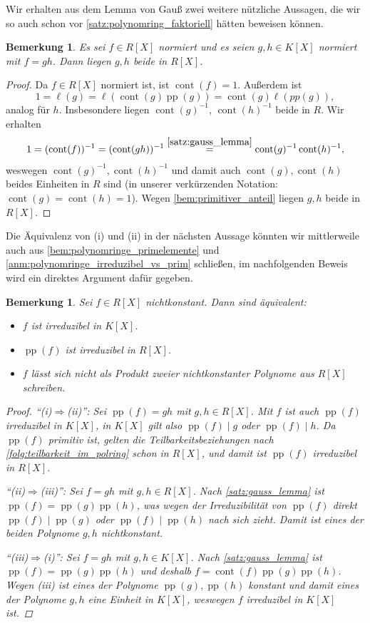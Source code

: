 \documentclass[a4paper, twoside, 11pt, ngerman]{report}
\DeclareMathOperator{\cont}{cont}
\DeclareMathOperator{\pp}{pp}
\theoremstyle{definistyle}
\newtheorem{bem}[satz]{Bemerkung}
\theoremstyle{remark}
\begin{document}
Wir erhalten aus dem Lemma von Gauß zwei weitere nützliche Aussagen, die wir so  
auch schon vor \ref{satz:polynomring_faktoriell} hätten beweisen können. 

\begin{bem}\label{bem:pol_schon_in_Rx}
Es sei $f\in R[X]$ normiert und es seien $g,h\in K[X]$ normiert mit $f=gh$.
Dann liegen $g,h$ beide in $R[X]$.
\end{bem}
\begin{proof}
Da $f\in R[X]$ normiert ist, ist $\cont(f)=1$. Außerdem ist
\[
1=\ell(g)=\ell(\cont(g)\pp(g))=\cont(g)\ell(pp(g)),
\]
analog für $h$. Insbesondere liegen $\cont(g)^{-1}$, $\cont(h)^{-1}$ beide in $R$. Wir erhalten
\[
1=(\cont(f))^{-1}=(\cont(gh))^{-1}\overset{\ref{satz:gauss_lemma}}{=}\cont(g)^{-1}\cont(h)^{-1},
\]
weswegen $\cont(g)^{-1},\cont(h)^{-1}$ und damit auch $\cont(g),\cont(h)$ beides Einheiten in $R$ sind (in unserer verkürzenden Notation: $\cont(g)=\cont(h)=1$). Wegen \ref{bem:primitiver_anteil} liegen $g,h$ beide in $R[X]$.
\end{proof}

Die Äquivalenz von (i) und (ii) in der nächsten Aussage könnten wir mittlerweile auch aus \ref{bem:polynomringe_primelemente} und \ref{anm:polynomringe_irreduzibel_vs_prim}
schließen, im nachfolgenden Beweis wird ein direktes Argument dafür gegeben.

\begin{bem}\label{bem:irreduzibilitaet_polynomringe}
Sei $f \in R[X]$ nichtkonstant. Dann sind äquivalent:
\begin{itemize}
    \item[(i)] $f$ ist irreduzibel in $K[X]$.
    \item[(ii)] $\pp(f)$ ist irreduzibel in $R[X]$.
    \item[(iii)] $f$ lässt sich nicht als Produkt zweier nichtkonstanter Polynome aus $R[X]$ schreiben.
\end{itemize}
\begin{proof}
"`(i)$\Rightarrow$(ii)"': Sei $\pp(f)=gh$ mit $g,h\in R[X]$. Mit $f$ ist auch $\pp(f)$ irreduzibel in $K[X]$, in $K[X]$ gilt also $\pp(f)\mid g$ oder $\pp(f)\mid h$.
Da $\pp(f)$ primitiv ist, gelten die Teilbarkeitsbeziehungen nach \ref{folg:teilbarkeit_im_polring} schon in $R[X]$,
und damit ist $\pp(f)$ irreduzibel in $R[X]$.

"`(ii)$\Rightarrow$(iii)"': Sei $f=gh$ mit $g,h\in R[X]$. Nach \ref{satz:gauss_lemma} ist
$\pp(f)=\pp(g)\pp(h)$, was wegen der Irreduzibilität von $\pp(f)$ direkt $\pp(f)\mid\pp(g)$ oder $\pp(f)\mid \pp(h)$ nach sich zieht. Damit ist eines der beiden Polynome $g,h$ nichtkonstant.

"`(iii)$\Rightarrow$(i)"': Sei $f=gh$ mit $g,h\in K[X]$. Nach \ref{satz:gauss_lemma} ist
$\pp(f)=\pp(g)\pp(h)$ und deshalb $f=\cont(f)\pp(g)\pp(h)$. Wegen (iii) ist eines der Polynome $\pp(g),\pp(h)$ konstant und damit eines der Polynome $g,h$ eine Einheit in $K[X]$,
weswegen $f$ irreduzibel in $K[X]$ ist. 
\end{proof}
\end{bem}
\end{document}
